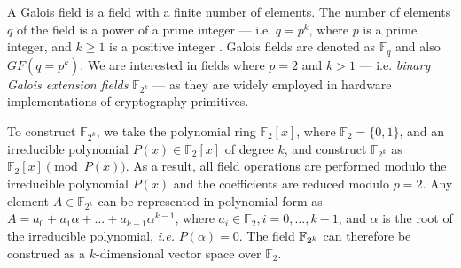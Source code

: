 


A Galois field is a field with a finite number of elements. The number
of elements $q$ of the field is a power of a prime integer --- i.e. $q
= p^k$, where $p$ is a prime integer, and $k \geq 1$ is a positive
integer \cite{galois_field:mceliece}. Galois fields are denoted as
${\mathbb{F}}_{q}$ and also $GF(q =p^k)$. We are interested in fields
where $p = 2$ and $k >1$ --- i.e. {\it   binary Galois extension
  fields} $\mathbb{F}_{2^k}$ --- as they are widely employed in
hardware implementations of cryptography primitives. 

To construct ${\mathbb{F}}_{2^k}$, we take the polynomial ring
${\mathbb{F}}_2[x]$, where ${\mathbb{F}}_{2} = \{0, 1\}$, and an
irreducible  polynomial $P(x) \in {\mathbb{F}}_2[x]$ of degree $k$, and
construct ${\mathbb{F}}_{2^k}$ as ${\mathbb{F}}_2[x] \pmod{   P(x)}$. As a
result, all field operations are performed 
modulo the irreducible polynomial $P(x)$ and the coefficients are
reduced modulo $p=2$. %
Any element $A \in {\mathbb{F}}_{2^k}$ can be represented in polynomial
form as $A = a_0 +  a_1 \alpha + \dots + a_{k-1} \alpha^{k-1}$, where
$a_i \in {\mathbb{F}}_2, i = 0, \dots, k-1$, and $\alpha$ is the root of
the irreducible polynomial, {\it i.e.} $P(\alpha)=0$. The field
${\mathbb{F}}_{2^k}$ can therefore be construed as a $k$-dimensional vector space
over ${\mathbb{F}}_2$.



